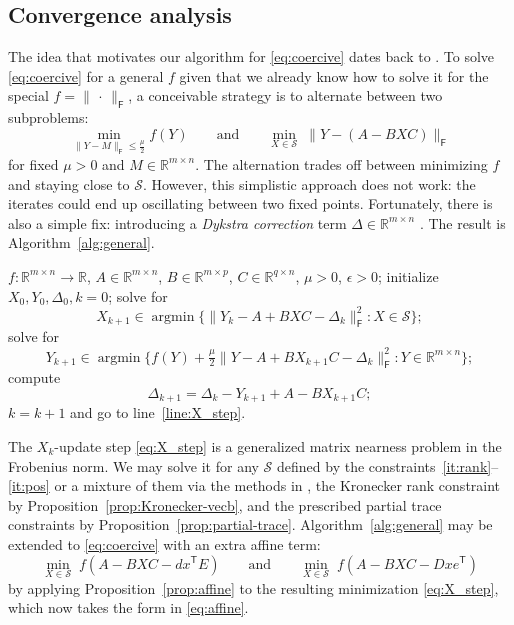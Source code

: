 \documentclass[11pt,reqno]{amsart}
\newcommand{\tp}{{\scriptscriptstyle\mathsf{T}}}
\newcommand{\F}{{\scriptscriptstyle\mathsf{F}}}
\DeclareMathOperator*{\argmin}{argmin}
\theoremstyle{definition}
\numberwithin{equation}{section}
\newcommand{\R}{\mathbb{R}}
\begin{document}
\subsection{Convergence analysis}\label{sec:conv}

The idea that motivates our algorithm for \eqref{eq:coercive} dates back to \cite{Dyk}. To solve \eqref{eq:coercive} for a general $f$ given that we already know how to solve it for the special $f = \lVert\,\cdot\,\rVert_\F$, a conceivable strategy is to alternate between two subproblems:
\[
\min_{\lVert Y-M \rVert_\F \le \frac{\mu}{2}} f(Y) \qquad \text{and} \qquad \min_{X \in \mathcal{S}} \; \lVert Y - (A - BXC) \rVert_\F
\]
for fixed $\mu > 0 $ and $M \in \R^{m\times n}$. The alternation trades off between minimizing $f$ and staying close to $\mathcal{S}$. However, this simplistic approach does not work: the iterates could end up oscillating between two fixed points. Fortunately, there is also a simple fix: introducing a \emph{Dykstra correction} term $\Delta \in \R^{m \times n}$ \cite{Dyk}.  The result is Algorithm~\ref{alg:general}.

\begin{algorithm}
\caption{Dykstra iteration} \label{alg:general}
\begin{algorithmic}[1]
\Require $f: \R^{m \times n} \to \R$, $ A \in \R^{m \times n}$, $B \in \R^{m \times p}$, $C \in \R^{q \times n} $, $\mu > 0$, $\epsilon > 0$;
\State initialize $X_0, Y_0, \Delta_0, k = 0$;
\State solve for
\begin{equation}\label{eq:X_step}
    X_{k+1} \in \argmin \bigl\{ \lVert Y_{k} - A + BXC - \Delta_k \rVert_\F^2 : X \in \mathcal{S}\bigr\};
\end{equation}
\label{line:X_step}
\State solve for
\begin{equation}\label{eq:Y_step}
    Y_{k+1} \in \argmin  \bigl\{ f(Y) + \tfrac{\mu}{2} \lVert Y - A + BX_{k+1}C - \Delta_k \rVert_\F^2 : Y \in \R^{m \times n}\bigr\};
\end{equation}
\label{line:Y_step}
\State compute 
\begin{equation}\label{eq:D_step}
    \Delta_{k+1} = \Delta_k - Y_{k+1} + A - BX_{k+1}C;
\end{equation}
\State $k = k+1$ and go to line~\ref{line:X_step}.
\end{algorithmic}
\end{algorithm}

The $X_k$-update step \eqref{eq:X_step} is a generalized matrix nearness problem in the Frobenius norm. We may solve it for any $\mathcal{S}$ defined by the constraints~\ref{it:rank}--\ref{it:pos} or a mixture of them via the methods in \cite{li22}, the Kronecker rank constraint by Proposition~\ref{prop:Kronecker-vecb}, and the prescribed partial trace constraints by Proposition~\ref{prop:partial-trace}. Algorithm~\ref{alg:general} may be extended to \eqref{eq:coercive} with an extra affine term:
\[
    \min_{X \in \mathcal{S}} \; f(A - BXC - dx^\tp E) \qquad \text{and} \qquad     \min_{X \in \mathcal{S}} \; f(A - BXC - Dxe^\tp)
\]
by applying Proposition~\ref{prop:affine} to the resulting minimization \eqref{eq:X_step}, which now takes the form in \eqref{eq:affine}.
\end{document}
